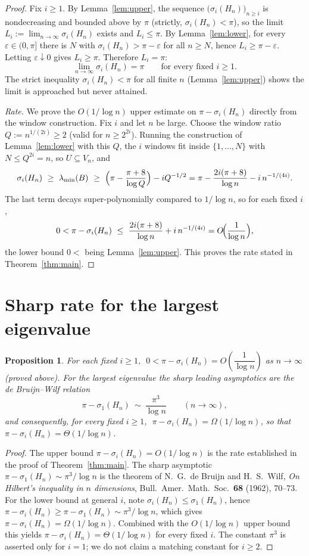 \documentclass[12pt]{article}
\newtheorem{proposition}{Proposition}
\theoremstyle{remark}
\begin{document}
\begin{proof}
Fix $i\ge1$. By Lemma~\ref{lem:upper}, the sequence $\bigl(\sigma_i(H_n)\bigr)_{n\ge i}$ is
nondecreasing and bounded above by $\pi$ (strictly, $\sigma_i(H_n)<\pi$), so the limit
$L_i:=\lim_{n\to\infty}\sigma_i(H_n)$ exists and $L_i\le\pi$. By Lemma~\ref{lem:lower}, for every
$\varepsilon\in(0,\pi]$ there is $N$ with $\sigma_i(H_n)>\pi-\varepsilon$ for all $n\ge N$, hence
$L_i\ge\pi-\varepsilon$. Letting $\varepsilon\downarrow0$ gives $L_i\ge\pi$. Therefore $L_i=\pi$:
\[
\lim_{n\to\infty}\sigma_i(H_n)=\pi\qquad\text{for every fixed }i\ge1 .
\]
The strict inequality $\sigma_i(H_n)<\pi$ for all finite $n$ (Lemma~\ref{lem:upper}) shows the
limit is approached but never attained.

\emph{Rate.} We prove the $O(1/\log n)$ upper estimate on $\pi-\sigma_i(H_n)$ directly from the
window construction. Fix $i$ and let $n$ be large. Choose the window ratio
$Q:=n^{1/(2i)}\ge2$ (valid for $n\ge 2^{2i}$). Running the construction of
Lemma~\ref{lem:lower} with this $Q$, the $i$ windows fit inside $\{1,\dots,N\}$ with
$N\le Q^{2i}=n$, so $U\subseteq V_n$, and
\[
\sigma_i(H_n)\ \ge\ \lambda_{\min}(B)\ \ge\ \Bigl(\pi-\frac{\pi+8}{\log Q}\Bigr)-iQ^{-1/2}
=\pi-\frac{2i(\pi+8)}{\log n}-i\,n^{-1/(4i)} .
\]
The last term decays super-polynomially compared to $1/\log n$, so for each fixed $i$,
\[
0<\pi-\sigma_i(H_n)\ \le\ \frac{2i(\pi+8)}{\log n}+i\,n^{-1/(4i)}=O\!\Bigl(\frac1{\log n}\Bigr),
\]
the lower bound $0<$ being Lemma~\ref{lem:upper}. This proves the rate stated in
Theorem~\ref{thm:main}.
\end{proof}

\section{Sharp rate for the largest eigenvalue}

\begin{proposition}\label{prop:rate}
For each fixed $i\ge1$, $\;0<\pi-\sigma_i(H_n)=O\!\left(\dfrac1{\log n}\right)$ as $n\to\infty$
(proved above). For the largest eigenvalue the sharp leading asymptotics are the de Bruijn--Wilf
relation
\[
\pi-\sigma_1(H_n)\ \sim\ \frac{\pi^3}{\log n}\qquad(n\to\infty),
\]
and consequently, for every fixed $i\ge1$,
$\;\pi-\sigma_i(H_n)=\Omega(1/\log n)$, so that $\pi-\sigma_i(H_n)=\Theta(1/\log n)$.
\end{proposition}

\begin{proof}
The upper bound $\pi-\sigma_i(H_n)=O(1/\log n)$ is the rate established in the proof of
Theorem~\ref{thm:main}. The sharp asymptotic
$\pi-\sigma_1(H_n)\sim\pi^3/\log n$ is the theorem of N.~G.~de Bruijn and H.~S.~Wilf,
\emph{On Hilbert's inequality in $n$ dimensions}, Bull.\ Amer.\ Math.\ Soc.\ \textbf{68} (1962),
70--73. For the lower bound at general $i$, note $\sigma_i(H_n)\le\sigma_1(H_n)$, hence
$\pi-\sigma_i(H_n)\ge\pi-\sigma_1(H_n)\sim\pi^3/\log n$, which gives
$\pi-\sigma_i(H_n)=\Omega(1/\log n)$. Combined with the $O(1/\log n)$ upper bound this yields
$\pi-\sigma_i(H_n)=\Theta(1/\log n)$ for every fixed $i$. The constant $\pi^3$ is asserted only for
$i=1$; we do not claim a matching constant for $i\ge2$.
\end{proof}
\end{document}
